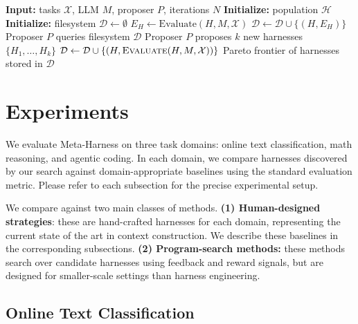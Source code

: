 \documentclass{article}
\begin{document}
\begin{algorithm}[t]
\caption{Meta-Harness outer loop over harnesses}
\label{alg:evolution}
\begin{algorithmic}[1]
\State \textbf{Input:} tasks $\mathcal{X}$, LLM $M$, proposer $P$, iterations $N$
\State \textbf{Initialize:} population $\mathcal{H}$ 
\State \textbf{Initialize:} filesystem $\mathcal{D} \leftarrow \emptyset$ 
  \State $E_H \leftarrow \textrm{Evaluate}(H, M, \mathcal{X})$
  \State $\mathcal{D} \leftarrow \mathcal{D} \cup \{(H, E_H)\}$
\EndFor
{}
  \State Proposer $P$ queries filesystem $\mathcal{D}$ 
  \State Proposer $P$ proposes $k$ new harnesses $\{H_1,\dots,H_k\}$
      \State $\mathcal{D} \leftarrow \mathcal{D} \cup \{(H,\textsc{Evaluate}(H,M,\mathcal{X}))\}$
    \EndIf
  \EndFor
\EndFor
\State \Return Pareto frontier of harnesses stored in $\mathcal{D}$
\end{algorithmic}
\end{algorithm}

\section{Experiments}
\label{sec:experiments}

We evaluate Meta-Harness on three task domains: online text classification, math reasoning, and agentic coding.
In each domain, we compare harnesses discovered by our search against domain-appropriate baselines using the standard evaluation metric.
Please refer to each subsection for the precise experimental setup.

We compare against two main classes of methods.
\textbf{(1) Human-designed strategies}: these are hand-crafted harnesses for each domain, representing the current state of the art in context construction.
We describe these baselines in the corresponding subsections.
\textbf{(2) Program-search methods:} these methods search over candidate harnesses using feedback and reward signals, but are designed for smaller-scale settings than harness engineering.


\subsection{Online Text Classification}
\label{subsec:text-classification}
\end{document}
